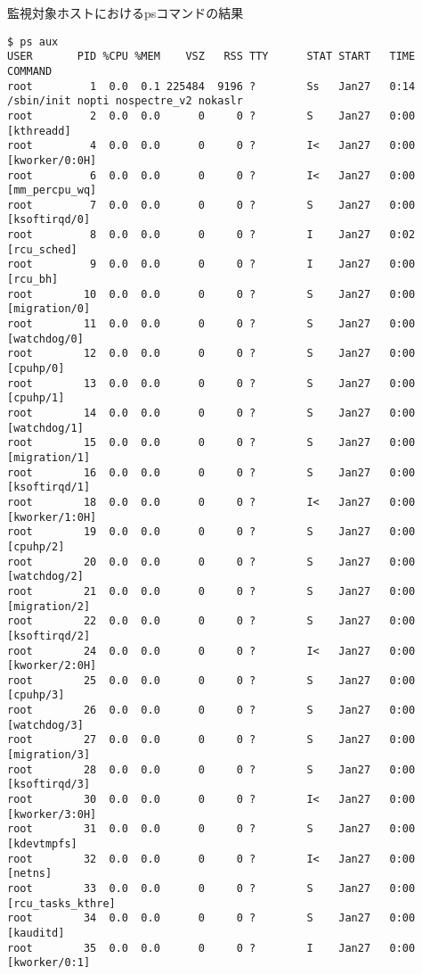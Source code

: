 \begin{itembox}[l]{監視対象ホストにおけるpsコマンドの結果}
    \label{itembox:result-ps}
    \begin{verbatim}
$ ps aux
USER       PID %CPU %MEM    VSZ   RSS TTY      STAT START   TIME COMMAND
root         1  0.0  0.1 225484  9196 ?        Ss   Jan27   0:14 /sbin/init nopti nospectre_v2 nokaslr
root         2  0.0  0.0      0     0 ?        S    Jan27   0:00 [kthreadd]
root         4  0.0  0.0      0     0 ?        I<   Jan27   0:00 [kworker/0:0H]
root         6  0.0  0.0      0     0 ?        I<   Jan27   0:00 [mm_percpu_wq]
root         7  0.0  0.0      0     0 ?        S    Jan27   0:00 [ksoftirqd/0]
root         8  0.0  0.0      0     0 ?        I    Jan27   0:02 [rcu_sched]
root         9  0.0  0.0      0     0 ?        I    Jan27   0:00 [rcu_bh]
root        10  0.0  0.0      0     0 ?        S    Jan27   0:00 [migration/0]
root        11  0.0  0.0      0     0 ?        S    Jan27   0:00 [watchdog/0]
root        12  0.0  0.0      0     0 ?        S    Jan27   0:00 [cpuhp/0]
root        13  0.0  0.0      0     0 ?        S    Jan27   0:00 [cpuhp/1]
root        14  0.0  0.0      0     0 ?        S    Jan27   0:00 [watchdog/1]
root        15  0.0  0.0      0     0 ?        S    Jan27   0:00 [migration/1]
root        16  0.0  0.0      0     0 ?        S    Jan27   0:00 [ksoftirqd/1]
root        18  0.0  0.0      0     0 ?        I<   Jan27   0:00 [kworker/1:0H]
root        19  0.0  0.0      0     0 ?        S    Jan27   0:00 [cpuhp/2]
root        20  0.0  0.0      0     0 ?        S    Jan27   0:00 [watchdog/2]
root        21  0.0  0.0      0     0 ?        S    Jan27   0:00 [migration/2]
root        22  0.0  0.0      0     0 ?        S    Jan27   0:00 [ksoftirqd/2]
root        24  0.0  0.0      0     0 ?        I<   Jan27   0:00 [kworker/2:0H]
root        25  0.0  0.0      0     0 ?        S    Jan27   0:00 [cpuhp/3]
root        26  0.0  0.0      0     0 ?        S    Jan27   0:00 [watchdog/3]
root        27  0.0  0.0      0     0 ?        S    Jan27   0:00 [migration/3]
root        28  0.0  0.0      0     0 ?        S    Jan27   0:00 [ksoftirqd/3]
root        30  0.0  0.0      0     0 ?        I<   Jan27   0:00 [kworker/3:0H]
root        31  0.0  0.0      0     0 ?        S    Jan27   0:00 [kdevtmpfs]
root        32  0.0  0.0      0     0 ?        I<   Jan27   0:00 [netns]
root        33  0.0  0.0      0     0 ?        S    Jan27   0:00 [rcu_tasks_kthre]
root        34  0.0  0.0      0     0 ?        S    Jan27   0:00 [kauditd]
root        35  0.0  0.0      0     0 ?        I    Jan27   0:00 [kworker/0:1]

\end{verbatim}
\end{itembox}
